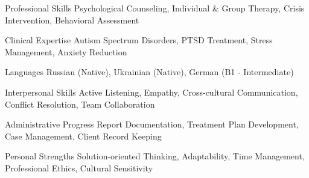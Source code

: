 


\begin{cvskills}


\cvskill
{Professional Skills} %
{Psychological Counseling, Individual \& Group Therapy, Crisis Intervention, Behavioral Assessment} %


\cvskill
{Clinical Expertise} %
{Autism Spectrum Disorders, PTSD Treatment, Stress Management, Anxiety Reduction} %


\cvskill
{Languages} %
{Russian (Native), Ukrainian (Native), German (B1 - Intermediate)} %


\cvskill
{Interpersonal Skills} %
{Active Listening, Empathy, Cross-cultural Communication, Conflict Resolution, Team Collaboration} %


\cvskill
{Administrative} %
{Progress Report Documentation, Treatment Plan Development, Case Management, Client Record Keeping} %


\cvskill
{Personal Strengths} %
{Solution-oriented Thinking, Adaptability, Time Management, Professional Ethics, Cultural Sensitivity} %


\end{cvskills}